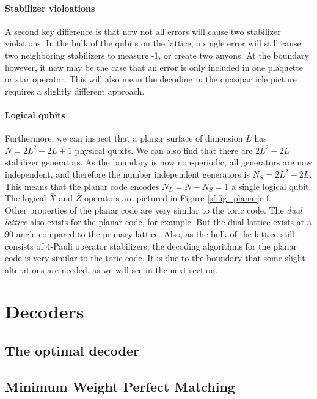 \paragraph{Stabilizer violoations}
A second key difference is that now not all errors will cause two stabilizer violations. In the bulk of the qubits on the lattice, a single error will still cause two neighboring stabilizers to measure -1, or create two anyons. At the boundary however, it now may be the case that an error is only included in one plaquette or star operator. This will also mean the decoding in the quasiparticle picture requires a slightly different approach.

\paragraph{Logical qubits}
Furthermore, we can inspect that a planar surface of dimension $L$ has $N = 2L^2-2L+1$ physical qubits. We can also find that there are $2L^2-2L$ stabilizer generators. As the boundary is now non-periodic, all generators are now independent, and therefore the number independent generators is $N_S = 2L^2-2L$. This means that the planar code encodes $N_L = N-N_S = 1$ a single logical qubit. The logical $\bar{X}$ and $\bar{Z}$ operators are pictured in Figure \ref{sf:fig_planar}e-f.\\

Other properties of the planar code are very similar to the toric code. The \emph{dual lattice} also exists for the planar code, for example. But the dual lattice exists at a 90 angle compared to the primary lattice. Also, as the bulk of the lattice still consists of 4-Pauli operator stabilizers, the decoding algorithms for the planar code is very similar to the toric code. It is due to the boundary that some slight alterations are needed, as we will see in the next section.

\section{Decoders}\label{sec:surface_decoders}
\subsection{The optimal decoder}\label{sec:optimal_decoder}
\subsection{Minimum Weight Perfect Matching}\label{sec:MWPMdecoder}
